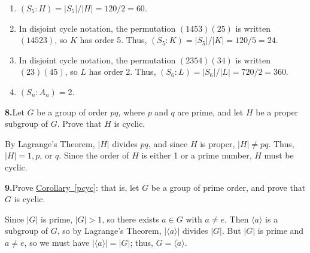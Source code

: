 \documentclass[10pt,]{book}
\theoremstyle{plain}
\theoremstyle{definition}
\theoremstyle{definition}
\theoremstyle{definition}
\theoremstyle{definition}
\numberwithin{equation}{section}
\begin{document}
%
\par\smallskip
\leavevmode%
\begin{enumerate}[label=(\alph*)]
\item\hypertarget{li-473}{}\((S_5:H)=|S_5|/|H|=120/2=60.\)%
\item\hypertarget{li-474}{}In disjoint cycle notation, the permutation \((1453)(25)\) is written \((14523)\), so \(K\) has order 5. Thus, \((S_5:K)=|S_5|/|K|=120/5=24.\)%
\item\hypertarget{li-475}{}In disjoint cycle notation, the permutation \((2354)(34)\) is written \((23)(45)\), so \(L\) has order 2. Thus, \((S_6:L)=|S_6|/|L|=720/2=360.\)%
\item\hypertarget{li-476}{}\((S_n:A_n)=2\).%
\end{enumerate}
\par\smallskip
\noindent\textbf{8.}\quad{}Let \(G\) be a group of order \(pq\), where \(p\) and \(q\) are prime, and let \(H\) be a proper subgroup of \(G\). Prove that \(H\) is cyclic.%
\par\smallskip
By Lagrange's Theorem, \(|H|\) divides \(pq\), and since \(H\) is proper, \(|H|\neq  pq\). Thus, \(|H|=1,p\), or \(q\). Since the order of \(H\) is either 1 or a prime number, \(H\) must be cyclic.%
\par\smallskip
\noindent\textbf{9.}\quad{}Prove \hyperref[pcyc]{Corollary~\ref{pcyc}}: that is, let \(G\) be a group of prime order, and prove that \(G\) is cyclic.%
\par\smallskip
Since \(|G|\) is prime, \(|G|>1\), so there exists \(a\in G\) with \(a\neq e\). Then \(\langle a\rangle\) is a subgroup of \(G\), so by Lagrange's Theorem, \(|\langle a\rangle |\) divides \(|G|\). But \(|G|\) is prime and \(a\neq e\), so we must have \(|\langle a\rangle |=|G|\); thus, \(G=\langle a\rangle\).%
\par\smallskip
\end{document}

